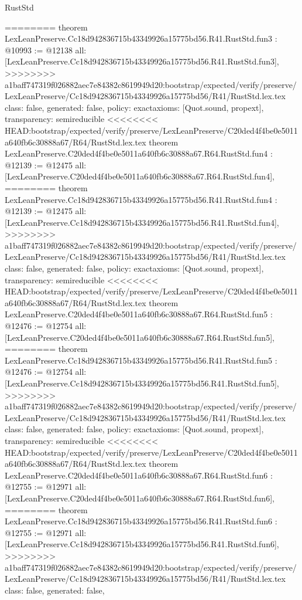 \begin{lexlean}{RustStd}
\begin{coremodule}
{\begin{coremodule}
{{{{{{========
theorem LexLeanPreserve.Cc18d942836715b43349926a15775bd56.R41.RustStd.fun3 : @10993 := @12138 {
  all: [LexLeanPreserve.Cc18d942836715b43349926a15775bd56.R41.RustStd.fun3],
>>>>>>>> a1baff747319f026882aec7e84382c8619949d20:bootstrap/expected/verify/preserve/LexLeanPreserve/Cc18d942836715b43349926a15775bd56/R41/RustStd.lex.tex
  class: false,
  generated: false,
  policy: exact{axioms: [Quot.sound, propext]},
  transparency: semireducible
}
<<<<<<<< HEAD:bootstrap/expected/verify/preserve/LexLeanPreserve/C20ded4f4be0e5011a640fb6c30888a67/R64/RustStd.lex.tex
theorem LexLeanPreserve.C20ded4f4be0e5011a640fb6c30888a67.R64.RustStd.fun4 : @12139 := @12475 {
  all: [LexLeanPreserve.C20ded4f4be0e5011a640fb6c30888a67.R64.RustStd.fun4],
========
theorem LexLeanPreserve.Cc18d942836715b43349926a15775bd56.R41.RustStd.fun4 : @12139 := @12475 {
  all: [LexLeanPreserve.Cc18d942836715b43349926a15775bd56.R41.RustStd.fun4],
>>>>>>>> a1baff747319f026882aec7e84382c8619949d20:bootstrap/expected/verify/preserve/LexLeanPreserve/Cc18d942836715b43349926a15775bd56/R41/RustStd.lex.tex
  class: false,
  generated: false,
  policy: exact{axioms: [Quot.sound, propext]},
  transparency: semireducible
}
<<<<<<<< HEAD:bootstrap/expected/verify/preserve/LexLeanPreserve/C20ded4f4be0e5011a640fb6c30888a67/R64/RustStd.lex.tex
theorem LexLeanPreserve.C20ded4f4be0e5011a640fb6c30888a67.R64.RustStd.fun5 : @12476 := @12754 {
  all: [LexLeanPreserve.C20ded4f4be0e5011a640fb6c30888a67.R64.RustStd.fun5],
========
theorem LexLeanPreserve.Cc18d942836715b43349926a15775bd56.R41.RustStd.fun5 : @12476 := @12754 {
  all: [LexLeanPreserve.Cc18d942836715b43349926a15775bd56.R41.RustStd.fun5],
>>>>>>>> a1baff747319f026882aec7e84382c8619949d20:bootstrap/expected/verify/preserve/LexLeanPreserve/Cc18d942836715b43349926a15775bd56/R41/RustStd.lex.tex
  class: false,
  generated: false,
  policy: exact{axioms: [Quot.sound, propext]},
  transparency: semireducible
}
<<<<<<<< HEAD:bootstrap/expected/verify/preserve/LexLeanPreserve/C20ded4f4be0e5011a640fb6c30888a67/R64/RustStd.lex.tex
theorem LexLeanPreserve.C20ded4f4be0e5011a640fb6c30888a67.R64.RustStd.fun6 : @12755 := @12971 {
  all: [LexLeanPreserve.C20ded4f4be0e5011a640fb6c30888a67.R64.RustStd.fun6],
========
theorem LexLeanPreserve.Cc18d942836715b43349926a15775bd56.R41.RustStd.fun6 : @12755 := @12971 {
  all: [LexLeanPreserve.Cc18d942836715b43349926a15775bd56.R41.RustStd.fun6],
>>>>>>>> a1baff747319f026882aec7e84382c8619949d20:bootstrap/expected/verify/preserve/LexLeanPreserve/Cc18d942836715b43349926a15775bd56/R41/RustStd.lex.tex
  class: false,
  generated: false,
}}}}}}}}}}
\end{coremodule}}
\end{coremodule}
\end{lexlean}
